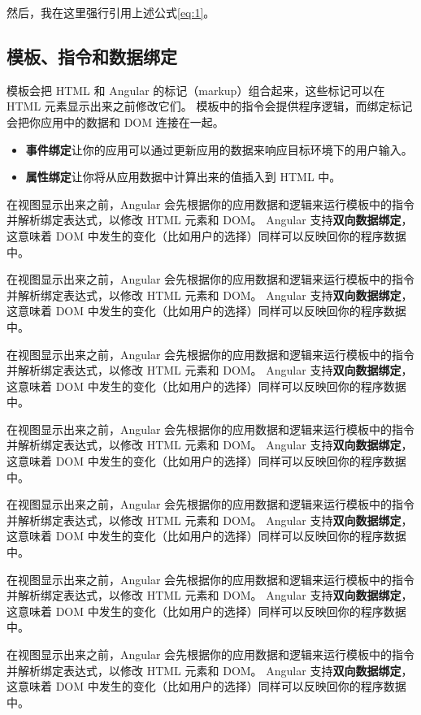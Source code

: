\documentclass[a4paper,twoside]{ctexbook}
\begin{document}
然后，我在这里强行引用上述公式\ref{eq:1}。

\subsection{模板、指令和数据绑定}

模板会把 HTML 和 Angular 的标记（markup）组合起来，这些标记可以在 HTML 元素显示出来之前修改它们。 模板中的指令会提供程序逻辑，而绑定标记会把你应用中的数据和 DOM 连接在一起。

\begin{itemize}
  \item \textbf{事件绑定}让你的应用可以通过更新应用的数据来响应目标环境下的用户输入。
  \item \textbf{属性绑定}让你将从应用数据中计算出来的值插入到 HTML 中。
\end{itemize}

在视图显示出来之前，Angular 会先根据你的应用数据和逻辑来运行模板中的指令并解析绑定表达式，以修改 HTML 元素和 DOM。 Angular 支持\textbf{双向数据绑定}，这意味着 DOM 中发生的变化（比如用户的选择）同样可以反映回你的程序数据中。

在视图显示出来之前，Angular 会先根据你的应用数据和逻辑来运行模板中的指令并解析绑定表达式，以修改 HTML 元素和 DOM。 Angular 支持\textbf{双向数据绑定}，这意味着 DOM 中发生的变化（比如用户的选择）同样可以反映回你的程序数据中。

在视图显示出来之前，Angular 会先根据你的应用数据和逻辑来运行模板中的指令并解析绑定表达式，以修改 HTML 元素和 DOM。 Angular 支持\textbf{双向数据绑定}，这意味着 DOM 中发生的变化（比如用户的选择）同样可以反映回你的程序数据中。

在视图显示出来之前，Angular 会先根据你的应用数据和逻辑来运行模板中的指令并解析绑定表达式，以修改 HTML 元素和 DOM。 Angular 支持\textbf{双向数据绑定}，这意味着 DOM 中发生的变化（比如用户的选择）同样可以反映回你的程序数据中。

在视图显示出来之前，Angular 会先根据你的应用数据和逻辑来运行模板中的指令并解析绑定表达式，以修改 HTML 元素和 DOM。 Angular 支持\textbf{双向数据绑定}，这意味着 DOM 中发生的变化（比如用户的选择）同样可以反映回你的程序数据中。

在视图显示出来之前，Angular 会先根据你的应用数据和逻辑来运行模板中的指令并解析绑定表达式，以修改 HTML 元素和 DOM。 Angular 支持\textbf{双向数据绑定}，这意味着 DOM 中发生的变化（比如用户的选择）同样可以反映回你的程序数据中。

在视图显示出来之前，Angular 会先根据你的应用数据和逻辑来运行模板中的指令并解析绑定表达式，以修改 HTML 元素和 DOM。 Angular 支持\textbf{双向数据绑定}，这意味着 DOM 中发生的变化（比如用户的选择）同样可以反映回你的程序数据中。
\end{document}
